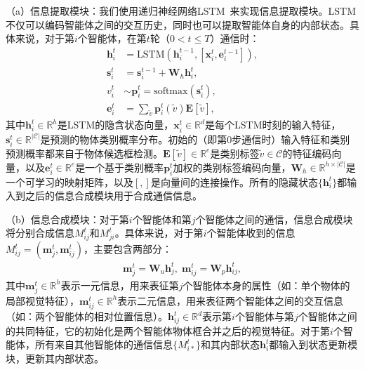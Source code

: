 （a）信息提取模块：我们使用递归神经网络LSTM~\cite{hochreiter1997long}来实现信息提取模块。LSTM不仅可以编码智能体之间的交互历史，同时也可以提取智能体自身的内部状态。具体来说，对于第$i$个智能体，在第$t$轮（$0 < t \leqslant T$）通信时：
\begin{equation}
\begin{aligned}
    \bm{h}^{t}_i & = \text{LSTM}(\bm{h}^{t-1}_i, [\bm{x}^{t}_i, \bm{e}^{t-1}_i]), \\
    \bm{s}^t_i & = \bm{s}^{t-1}_i + \bm{W}_h \bm{h}^{t}_i, \\
    v^t_i & \sim \bm{p}^{t}_i = \text{softmax}(\bm{s}^t_i), \\
    \bm{e}^{t}_i &= \textstyle{\sum_{\tilde{v}}} \bm{p}^{t}_i(\tilde{v}) \mathbf{E}[\tilde{v}],
\end{aligned}
\end{equation}
其中$\bm{h}^t_i \in \mathbb{R}^h$是LSTM的隐含状态向量，$\bm{x}^t_i \in \mathbb{R}^d$是每个LSTM时刻的输入特征，$\bm{s}^t_i \in \mathbb{R}^{|\mathcal{C}|}$是预测的物体类别概率分布。初始的（即第0步通信时）输入特征和类别预测概率都来自于物体候选框检测。$\mathbf{E}[\tilde{v}] \in \mathbb{R}^e$是类别标签$\tilde{v} \in \mathcal{C}$的特征编码向量，以及$\bm{e}^{t}_i \in \mathbb{R}^e$是一个基于类别概率$\bm{p}^t_i$加权的类别标签编码向量，$\bm{W}_h \in \mathbb{R}^{h \times |\mathcal{C}|}$是一个可学习的映射矩阵，以及$[,]$是向量间的连接操作。所有的隐藏状态$\{\bm{h}^t_i\}$都输入到之后的信息合成模块用于合成通信信息。


（b）信息合成模块：对于第$i$个智能体和第$j$个智能体之间的通信，信息合成模块将分别合成信息$M^t_{ij}$和$M^t_{ji}$。具体来说，对于第$i$个智能体收到的信息$M^t_{ij} = (\bm{m}^t_j, \bm{m}^t_{ij})$，主要包含两部分：
\begin{equation}
\begin{aligned}
\bm{m}^t_j = \bm{W}_u \bm{h}^t_j, \; \bm{m}^t_{ij} = \bm{W}_p\bm{h}^t_{ij},
\end{aligned}
\end{equation}
其中$\bm{m}^t_j \in \mathbb{R}^h$表示一元信息，用来表征第$j$个智能体本身的属性（如：单个物体的局部视觉特征），$\bm{m}^t_{ij} \in \mathbb{R}^h$表示二元信息，用来表征两个智能体之间的交互信息（如：两个智能体的相对位置信息）。$\bm{h}^t_{ij} \in \mathbb{R}^d$表示第$i$个智能体与第$j$个智能体之间的共同特征，它的初始化是两个智能体物体框合并之后的视觉特征。对于第$i$个智能体，所有来自其他智能体的通信信息$\{M^t_{i*}\}$和其内部状态$\bm{h}^t_i$都输入到状态更新模块，更新其内部状态。

